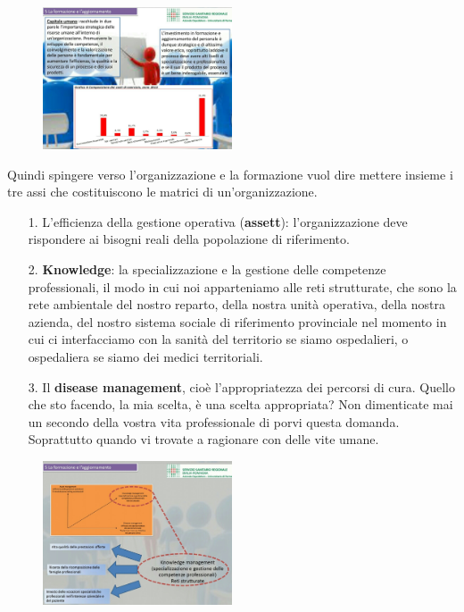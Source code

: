 \begin{figure}[!ht]
\centering
	\includegraphics[width=0.5\textwidth]{32/image20.jpeg}
	\end{figure}

Quindi spingere verso l'organizzazione e la formazione vuol dire mettere
insieme i tre assi che costituiscono le matrici di un'organizzazione.

\begin{itemize}
\item[1.]
  L'efficienza della gestione operativa (\textbf{assett}):
  l'organizzazione deve rispondere ai bisogni reali della popolazione di
  riferimento.
\item[2.]
  \textbf{Knowledge}: la specializzazione e la gestione delle competenze
  professionali, il modo in cui noi apparteniamo alle reti strutturate,
  che sono la rete ambientale del nostro reparto, della nostra unità
  operativa, della nostra azienda, del nostro sistema sociale di
  riferimento provinciale nel momento in cui ci interfacciamo con la
  sanità del territorio se siamo ospedalieri, o ospedaliera se siamo dei
  medici territoriali.
\item[3.]
  Il \textbf{disease management}, cioè l'appropriatezza dei percorsi di
  cura. Quello che sto facendo, la mia scelta, è una scelta appropriata?
  Non dimenticate mai un secondo della vostra vita professionale di
  porvi questa domanda. Soprattutto quando vi trovate a ragionare con
  delle vite umane.
\end{itemize}

 \begin{figure}[!ht]
\centering
	\includegraphics[width=0.5\textwidth]{32/image21.jpeg}
	\end{figure}

